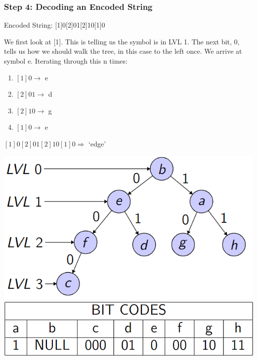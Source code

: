 \documentclass{beamer}
\begin{document}
\begin{frame}
    \frametitle{Step 4: Decoding an Encoded String}

    \begin{minipage}[t]{0.6\linewidth}
        Encoded String: [1]0[2]01[2]10[1]0

        We first look at [1]. This is telling us the symbol is in LVL 1. The next bit, 0, tells us how we should walk the tree, in this case to the left once. We arrive at symbol e. Iterating through this n times:

        \begin{enumerate}
            \item $[1]0 \rightarrow$ e
            \item $[2]01 \rightarrow$ d
            \item $[2]10 \rightarrow$ g
            \item $[1]0 \rightarrow$ e
        \end{enumerate}

        $[1]0[2]01[2]10[1]0 \Rightarrow$ `edge' 
    \end{minipage}
    \hfill
    \begin{minipage}[t]{0.35\linewidth}
        \vspace{0pt}
        \begin{flushright}
            \includegraphics[scale=0.3]{images/bintree.png}
            \includegraphics[scale=0.25]{images/bitcode.png}
        \end{flushright}
    \end{minipage}
\end{frame}
\end{document}
